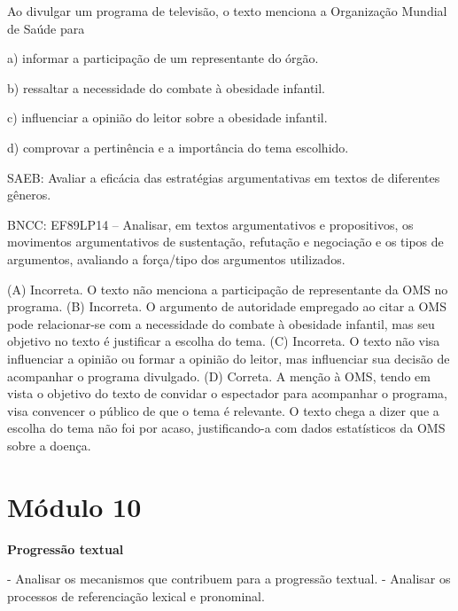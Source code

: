 
Ao divulgar um programa de televisão, o texto menciona a Organização
Mundial de Saúde para

a) informar a participação de um representante do órgão.

b) ressaltar a necessidade do combate à obesidade infantil.

c) influenciar a opinião do leitor sobre a obesidade infantil.

d) comprovar a pertinência e a importância do tema escolhido.

SAEB: Avaliar a eficácia das estratégias argumentativas em textos de
diferentes gêneros.

BNCC: EF89LP14 -- Analisar, em textos argumentativos e propositivos, os
movimentos argumentativos de sustentação, refutação e negociação e os
tipos de argumentos, avaliando a força/tipo dos argumentos utilizados.

(A) Incorreta. O texto não menciona a participação de representante da
OMS no programa. (B) Incorreta. O argumento de autoridade empregado ao
citar a OMS pode relacionar-se com a necessidade do combate à obesidade
infantil, mas seu objetivo no texto é justificar a escolha do tema. (C)
Incorreta. O texto não visa influenciar a opinião ou formar a opinião do
leitor, mas influenciar sua decisão de acompanhar o programa divulgado.
(D) Correta. A menção à OMS, tendo em vista o objetivo do texto de
convidar o espectador para acompanhar o programa, visa convencer o
público de que o tema é relevante. O texto chega a dizer que a escolha
do tema não foi por acaso, justificando-a com dados estatísticos da OMS
sobre a doença.

\hypertarget{muxf3dulo-10}{%
\section{Módulo 10}\label{muxf3dulo-10}}

\textbf{Progressão textual}

 - Analisar os mecanismos que contribuem
para a progressão textual. - Analisar os processos de referenciação
lexical e pronominal.


